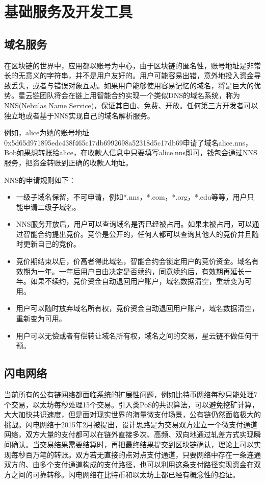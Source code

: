 \section{基础服务及开发工具}
\label{sec:tools}

\subsection{域名服务}

在区块链的世界中，应用都以账号为中心，由于区块链的匿名性，账号地址是非常长的无意义的字符串，并不是用户友好的。用户可能容易出错，意外地投入资金导致丢失，或者与错误对象互动。如果用户能够使用容易记忆的域名，将是巨大的优势。星云链团队将会在链上用智能合约实现一个类似DNS的域名系统，称为NNS(Nebulas Name Service)，保证其自由、免费、开放。任何第三方开发者可以独立地或者基于NNS实现自己的域名解析服务。

例如，alice为她的账号地址0x5d65d971895edc438f465c17db6992698a52318d5c17db69申请了域名alice.nns，Bob如果想转账给alice，在收款人信息中只要填写alice.nns即可，钱包会通过NNS服务，把资金转账到正确的收款人地址。

NNS的申请规则如下：
\begin{itemize}
	\item 一级子域名保留，不可申请，例如*.nns，*.com，*.org，*.edu等等，用户只能申请二级子域名。
	\item NNS服务开放后，用户可以查询域名是否已经被占用。如果未被占用，可以通过智能合约提出竞价。竞价是公开的，任何人都可以查询其他人的竞价并且随时更新自己的竞价。
	\item 竞价期结束以后，价高者得此域名，智能合约会锁定用户的竞价资金。域名有效期为一年。一年后用户自由决定是否续约，同意续约后，有效期再延长一年。如果不续约，竞价资金自动退回用户账户，域名数据清空，重新变为可用。
	\item 用户可以随时放弃域名所有权，竞价资金自动退回用户账户，域名数据清空，重新变为可用。
	\item 用户可以无偿或者有偿转让域名所有权，域名之间的交易，星云链不做任何干预。
\end{itemize}


\subsection{闪电网络}
当前所有的公有链网络都面临系统的扩展性问题，例如比特币网络每秒只能处理7个交易，以太坊每秒处理15个交易。引入类PoS的共识算法，可以避免挖矿计算，大大加快共识速度，但是面对现实世界的海量微支付场景，公有链仍然面临极大的挑战。闪电网络\cite{poon2015bitcoin}于2015年2月被提出，设计思路是为交易双方建立一个微支付通道网络，双方大量的支付都可以在链外直接多次、高频、双向地通过轧差方式实现瞬间确认。当交易结果需要结算时，再把最终结果提交到区块链确认，理论上可以实现每秒百万笔的转账。双方若无直接的点对点支付通道，只要网络中存在一条连通双方的、由多个支付通道构成的支付路径，也可以利用这条支付路径实现资金在双方之间的可靠转移。闪电网络在比特币和以太坊上都已经有概念性的验证。

